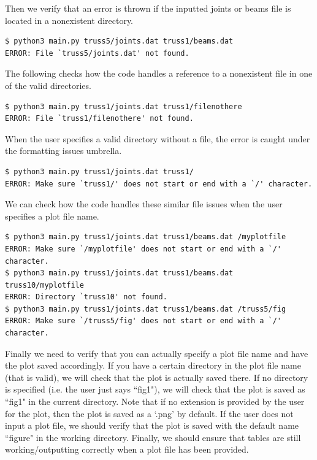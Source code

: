\documentclass[11pt]{amsart}
\theoremstyle{definition}
\begin{document}
Then we verify that an error is thrown if the inputted joints or beams file is located in a nonexistent directory.
\begin{Verbatim}[fontsize=\small]
$ python3 main.py truss5/joints.dat truss1/beams.dat
ERROR: File `truss5/joints.dat' not found.
\end{Verbatim}
The following checks how the code handles a reference to a nonexistent file in one of the valid directories.\begin{Verbatim}[fontsize=\small]
$ python3 main.py truss1/joints.dat truss1/filenothere
ERROR: File `truss1/filenothere' not found.
\end{Verbatim}
When the user specifies a valid directory without a file, the error is caught under the formatting issues umbrella.
\begin{Verbatim}[fontsize=\small]
$ python3 main.py truss1/joints.dat truss1/
ERROR: Make sure `truss1/' does not start or end with a `/' character.
\end{Verbatim}
We can check how the code handles these similar file issues when the user specifies a plot file name.
\begin{Verbatim}[fontsize=\small]
$ python3 main.py truss1/joints.dat truss1/beams.dat /myplotfile
ERROR: Make sure `/myplotfile' does not start or end with a `/' character.
$ python3 main.py truss1/joints.dat truss1/beams.dat truss10/myplotfile
ERROR: Directory `truss10' not found.
$ python3 main.py truss1/joints.dat truss1/beams.dat /truss5/fig
ERROR: Make sure `/truss5/fig' does not start or end with a `/' character.
\end{Verbatim}
Finally we need to verify that you can actually specify a plot file name and have the plot saved accordingly. If you have a certain directory in the plot file name (that is valid), we will check that the plot is actually saved there. If no directory is specified (i.e. the user just says ``fig1"), we will check that the plot is saved as ``fig1" in the current directory. Note that if no extension is provided by the user for the plot, then the plot is saved as a `.png' by default. If the user does not input a plot file, we should verify that the plot is saved with the default name ``figure" in the working directory. Finally, we should ensure that tables are still working/outputting correctly when a plot file has been provided.
\end{document}
